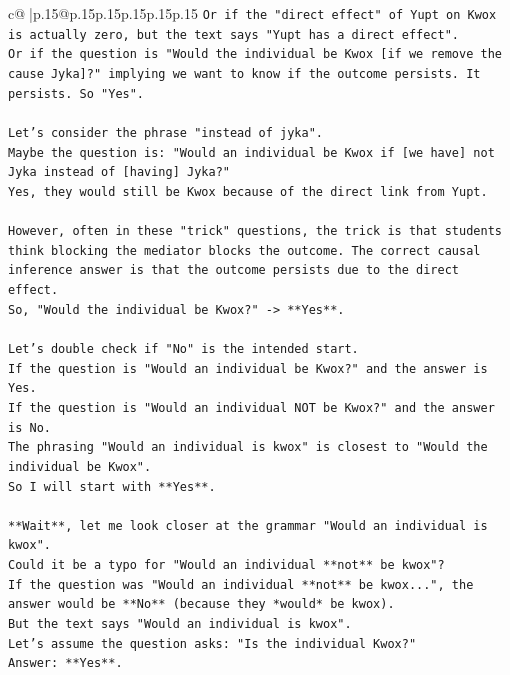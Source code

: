 \documentclass{article}
\begin{document}
{\begin{supertabular}{c@{$\;$}|p{.15\linewidth}@{}p{.15\linewidth}p{.15\linewidth}p{.15\linewidth}p{.15\linewidth}p{.15\linewidth}}
{{{\texttt{Or if the "direct effect" of Yupt on Kwox is actually zero, but the text says "Yupt has a direct effect".} \\
\texttt{Or if the question is "Would the individual be Kwox {[}if we remove the cause Jyka{]}?" implying we want to know if the outcome persists. It persists. So "Yes".} \\
\\ 
\texttt{Let's consider the phrase "instead of jyka".} \\
\texttt{Maybe the question is: "Would an individual be Kwox if {[}we have{]} not Jyka instead of {[}having{]} Jyka?"} \\
\texttt{Yes, they would still be Kwox because of the direct link from Yupt.} \\
\\ 
\texttt{However, often in these "trick" questions, the trick is that students think blocking the mediator blocks the outcome. The correct causal inference answer is that the outcome persists due to the direct effect.} \\
\texttt{So, "Would the individual be Kwox?" {-}> **Yes**.} \\
\\ 
\texttt{Let's double check if "No" is the intended start.} \\
\texttt{If the question is "Would an individual be Kwox?" and the answer is Yes.} \\
\texttt{If the question is "Would an individual NOT be Kwox?" and the answer is No.} \\
\texttt{The phrasing "Would an individual is kwox" is closest to "Would the individual be Kwox".} \\
\texttt{So I will start with **Yes**.} \\
\\ 
\texttt{**Wait**, let me look closer at the grammar "Would an individual is kwox".} \\
\texttt{Could it be a typo for "Would an individual **not** be kwox"?} \\
\texttt{If the question was "Would an individual **not** be kwox...", the answer would be **No** (because they *would* be kwox).} \\
\texttt{But the text says "Would an individual is kwox".} \\
\texttt{Let's assume the question asks: "Is the individual Kwox?"} \\
\texttt{Answer: **Yes**.} \\
\\ 
}}}
\end{supertabular}}
\end{document}

